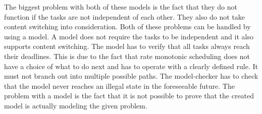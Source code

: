 The biggest problem with both of these models is the fact that they do not function if the tasks are not independent of each other. They also do not take content switching into consideration. Both of these problems can be handled by using a model. A model does not require the tasks to be independent and it also supports content switching. The model has to verify that all tasks always reach their deadlines. This is due to the fact that rate monotonic scheduling does not have a choice of what to do next and has to operate with a clearly defined rule. It must not branch out into multiple possible paths. The model-checker has to check that the model never reaches an illegal state in the foreseeable future. The problem with a model is the fact that it is not possible to prove that the created model is actually modeling the given problem.
